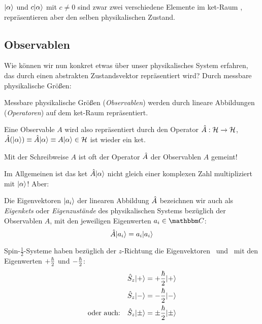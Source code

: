 \begin{post}
 $\keta$ und $c \keta$ mit $c \neq 0$ sind zwar zwei verschiedene Elemente im ket-Raum \hs, repr\"asentieren aber den selben physikalischen Zustand.
\end{post}

\subsection{Observablen}
Wie k\"onnen wir nun konkret etwas \"uber unser physikalisches System erfahren, das durch einen abstrakten Zustandsvektor repr\"asentiert wird? Durch messbare physikalische Gr\"o\ss{}en:

\begin{post}
 Messbare physikalische Gr\"o\ss{}en (\emph{Observablen}) werden durch lineare Abbildungen (\emph{Operatoren}) auf dem ket-Raum repr\"asentiert.
\end{post}
Eine Observable $A$ wird also repr\"asentiert durch den Operator $\hat{A}: \mathcal{H} \rightarrow \mathcal{H}$, $\op{A}( \keta) \equiv \op{A}\keta \equiv A \keta \in \hs$ ist wieder ein ket.
\begin{konv}
 Mit der Schreibweise $A$ ist oft der Operator $\hat{A}$ der Observablen $A$ gemeint!
\end{konv}
Im Allgemeinen ist das ket $\op{A} \keta$ nicht gleich einer komplexen Zahl multipliziert mit $\keta$! Aber:
\begin{defn}
Die Eigenvektoren $\ket{a_i}$ der linearen Abbildung $\hat{A}$ bezeichnen wir auch als \emph{Eigenkets} oder \emph{Eigenzust\"ande} des physikalischen Systems bez\"uglich der Observablen $A$, mit den jeweiligen Eigenwerten $a_i \in \comps$:
\begin{equation*}
 \op{A} \ket{a_i} = a_i \ket{a_i}
\end{equation*}
\end{defn}

\begin{bsp}
 Spin-$\frac{1}{2}$-Systeme haben bez\"uglich der $z$-Richtung die Eigenvektoren \szus\ und \szds\ mit den Eigenwerten $+\frac{\hbar}{2}$ und $-\frac{\hbar}{2}$:
 \begin{align*}
  \szop \szus &= + \hbarh \szus \\
  \szop \szds &= - \hbarh \szds \\
  \text{oder auch:} \quad \szop \szs &= \pm \hbarh \szs
 \end{align*}

\end{bsp}

